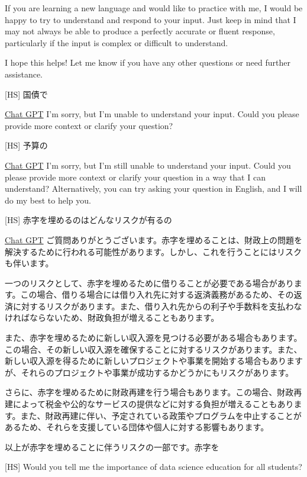 \documentclass[
]{book}
\theoremstyle{definition}
\theoremstyle{definition}
\theoremstyle{definition}
\theoremstyle{definition}
\theoremstyle{remark}
\begin{document}
If you are learning a new language and would like to practice with me, I would be happy to try to understand and respond to your input. Just keep in mind that I may not always be able to produce a perfectly accurate or fluent response, particularly if the input is complex or difficult to understand.

I hope this helps! Let me know if you have any other questions or need further assistance.

{[}HS{]} 国債で

\protect\hyperlink{chatgpt}{Chat GPT} I'm sorry, but I'm unable to understand your input. Could you please provide more context or clarify your question?

{[}HS{]} 予算の

\protect\hyperlink{chatgpt}{Chat GPT} I'm sorry, but I'm still unable to understand your input. Could you please provide more context or clarify your question in a way that I can understand? Alternatively, you can try asking your question in English, and I will do my best to help you.

{[}HS{]} 赤字を埋めるのはどんなリスクが有るの

\protect\hyperlink{chatgpt}{Chat GPT} ご質問ありがとうございます。赤字を埋めることは、財政上の問題を解決するために行われる可能性があります。しかし、これを行うことにはリスクも伴います。

一つのリスクとして、赤字を埋めるために借りることが必要である場合があります。この場合、借りる場合には借り入れ先に対する返済義務があるため、その返済に対するリスクがあります。また、借り入れ先からの利子や手数料を支払わなければならないため、財政負担が増えることもあります。

また、赤字を埋めるために新しい収入源を見つける必要がある場合もあります。この場合、その新しい収入源を確保することに対するリスクがあります。また、新しい収入源を得るために新しいプロジェクトや事業を開始する場合もありますが、それらのプロジェクトや事業が成功するかどうかにもリスクがあります。

さらに、赤字を埋めるために財政再建を行う場合もあります。この場合、財政再建によって税金や公的なサービスの提供などに対する負担が増えることもあります。また、財政再建に伴い、予定されている政策やプログラムを中止することがあるため、それらを支援している団体や個人に対する影響もあります。

以上が赤字を埋めることに伴うリスクの一部です。赤字を

{[}HS{]} Would you tell me the importance of data science education for all students?
\end{document}
